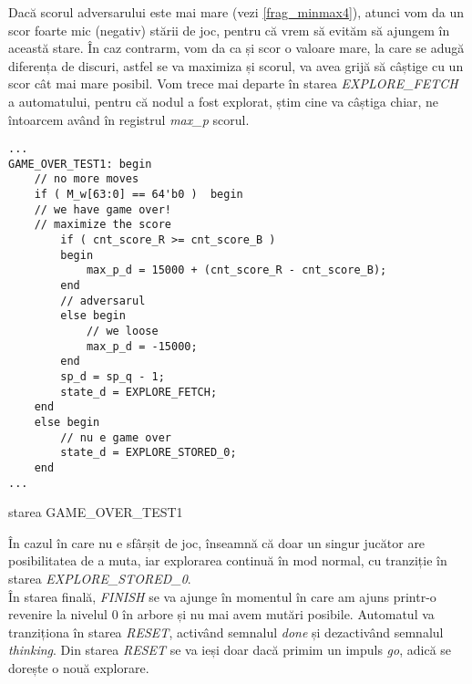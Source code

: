 \documentclass[12pt,twoside,a4paper,fleqn]{book}
\theoremstyle{definition}
\begin{document}
Dacă scorul adversarului este mai mare (vezi \ref{frag_minmax4}), atunci vom da un scor foarte mic (negativ) stării de joc, pentru că vrem să evităm să ajungem în această stare. În caz contrarm, vom da ca și scor o valoare mare, la care se adugă diferența de discuri, astfel se va maximiza și scorul, va avea grijă să câștige cu un scor cât mai mare posibil. Vom trece mai departe în starea \emph{EXPLORE\_FETCH} a automatului, pentru că nodul a fost explorat, știm cine va câștiga chiar, ne întoarcem având în registrul \emph{max\_p} scorul.\\
\begin{fragmentsursa}
\begin{scriptsize}
\begin{verbatim}
...
GAME_OVER_TEST1: begin
    // no more moves
    if ( M_w[63:0] == 64'b0 )  begin
    // we have game over!
    // maximize the score
        if ( cnt_score_R >= cnt_score_B ) 
        begin
            max_p_d = 15000 + (cnt_score_R - cnt_score_B);
        end
        // adversarul
        else begin
            // we loose
            max_p_d = -15000;
        end
        sp_d = sp_q - 1;
        state_d = EXPLORE_FETCH;
    end
    else begin
        // nu e game over
        state_d = EXPLORE_STORED_0;    
    end
...
\end{verbatim}
\end{scriptsize}
\caption{starea GAME\_OVER\_TEST1}
\label{frag_minmax4}
\end{fragmentsursa}
În cazul în care nu e sfârșit de joc, înseamnă că doar un singur jucător are posibilitatea de a muta, iar explorarea continuă în mod normal, cu tranziție în starea \emph{EXPLORE\_STORED\_0}.\\
În starea finală, \emph{FINISH} se va ajunge în momentul în care am ajuns printr-o revenire la nivelul $0$ în arbore și nu mai avem mutări posibile. Automatul va tranziționa în starea \emph{RESET}, activând semnalul \emph{done} și dezactivând semnalul \emph{thinking}. Din starea \emph{RESET} se va ieși doar dacă primim un impuls \emph{go}, adică se dorește o nouă explorare.
\end{document}
